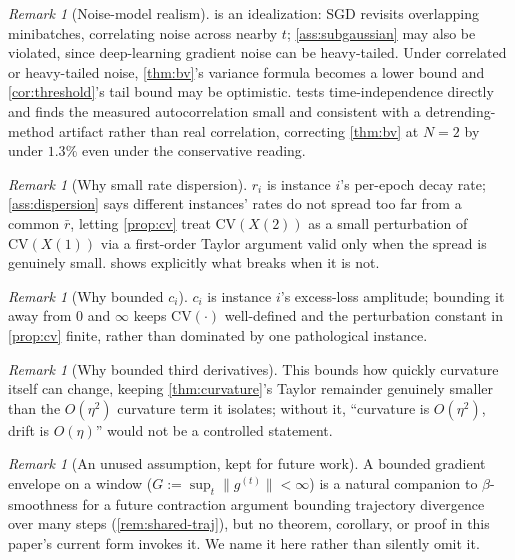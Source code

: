 \documentclass{article}
\theoremstyle{plain}
\theoremstyle{definition}
\theoremstyle{remark}
\newtheorem{remark}[theorem]{Remark}
\newcommand{\CV}{\mathrm{CV}}
\begin{document}
\begin{remark}[Noise-model realism]
 is an idealization: SGD revisits overlapping minibatches, correlating noise across nearby $t$; \cref{ass:subgaussian} may also be violated, since deep-learning gradient noise can be heavy-tailed. Under correlated or heavy-tailed noise, \cref{thm:bv}'s variance formula becomes a lower bound and \cref{cor:threshold}'s tail bound may be optimistic.  tests time-independence directly and finds the measured autocorrelation small and consistent with a detrending-method artifact rather than real correlation, correcting \cref{thm:bv} at $N{=}2$ by under $1.3\%$ even under the conservative reading.
\end{remark}

\begin{remark}[Why small rate dispersion]
$r_i$ is instance $i$'s per-epoch decay rate; \cref{ass:dispersion} says different instances' rates do not spread too far from a common $\bar r$, letting \cref{prop:cv} treat $\CV(X(2))$ as a small perturbation of $\CV(X(1))$ via a first-order Taylor argument valid only when the spread is genuinely small.  shows explicitly what breaks when it is not.
\end{remark}

\begin{remark}[Why bounded $c_i$]
$c_i$ is instance $i$'s excess-loss amplitude; bounding it away from $0$ and $\infty$ keeps $\CV(\cdot)$ well-defined and the perturbation constant in \cref{prop:cv} finite, rather than dominated by one pathological instance.
\end{remark}

\begin{remark}[Why bounded third derivatives]
This bounds how quickly curvature itself can change, keeping \cref{thm:curvature}'s Taylor remainder genuinely smaller than the $O(\eta^2)$ curvature term it isolates; without it, ``curvature is $O(\eta^2)$, drift is $O(\eta)$'' would not be a controlled statement.
\end{remark}

\begin{remark}[An unused assumption, kept for future work]
\label{ass:envelope-app}
A bounded gradient envelope on a window ($G := \sup_t\|g^{(t)}\|<\infty$) is a natural companion to $\beta$-smoothness for a future contraction argument bounding trajectory divergence over many steps (\cref{rem:shared-traj}), but no theorem, corollary, or proof in this paper's current form invokes it. We name it here rather than silently omit it.
\end{remark}
\end{document}
